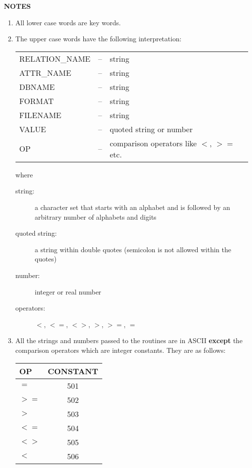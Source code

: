 \begin{flushleft}
\bf{NOTES}
\end{flushleft}
\begin{enumerate}
\item All lower case words are key words. 

\item The upper case words have the following interpretation:

\begin{center}
\begin{tabular}{l l l}
RELATION\_NAME \/ & -- & \/ string   \\
ATTR\_NAME     \/ & -- & \/ string   \\
DBNAME         \/ & -- & \/ string   \\
FORMAT         \/ & -- & \/ string   \\
FILENAME       \/ & -- & \/ string   \\
VALUE          \/ & -- & \/ quoted string or number  \\
OP             \/ & -- & \/ comparison operators like $<$, $>=$ etc.
\end{tabular}
\end{center}

where

\begin{description}
\item[\hspace*{0.5in} string:]  a character set that starts with an alphabet
and is followed by an \\
\hspace*{0.8in}arbitrary number of alphabets and digits
\item[\hspace*{0.5in} quoted string:]  a string within double quotes (semicolon is
not allowed within the quotes)
\item[\hspace*{0.5in} number:]  integer or real number
\item[\hspace*{0.5in} operators:]  $<$, $<=$, $<>$, $>$, $>=$, $=$
\end{description}

\item All the strings and numbers passed to the routines are in ASCII 
{\bf except} the comparison operators which are integer constants.
They are as follows: 
\begin{center}
\begin{tabular}{l c}
OP       &  CONSTANT  \\
\hline
$=$        &  501  \\
$>=$     &  502  \\
$>$      &  503  \\
$<=$     &  504  \\
$<>$   &  505  \\
$<$      &  506 \\
\hline
\end{tabular}
\end{center}


\end{enumerate}
